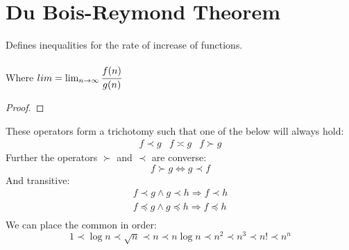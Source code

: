 \documentclass{report}
\begin{document}
    \section*{Du Bois-Reymond Theorem}
        Defines inequalities for the rate of increase of functions.
        \\
        \\ Where $lim = \lim_{n \to \infty}{\cfrac{f(n)}{g(n)}}$
        \begin{proof}
        \end{proof}
        These operators form a trichotomy such that one of the below will always hold:
        \[\begin{matrix}
            f \prec g & f \asymp g & f \succ g
        \end{matrix}\]
        Further the operators $\succ$ and $\prec$ are converse:
        \[f \succ g \Leftrightarrow g \prec f\]
        And transitive:
        \[\begin{matrix}
            f \prec g \land g \prec h \Rightarrow f \prec h \\
            f \preccurlyeq g \land g \preccurlyeq h \Rightarrow f \preccurlyeq h \\
        \end{matrix}\]
        We can place the common  in order:
        \[1 \prec \log{n} \prec \sqrt{n} \prec n \prec n \log{n} \prec n^2 \prec n^3 \prec n! \prec n^n\]
    
\end{document}
